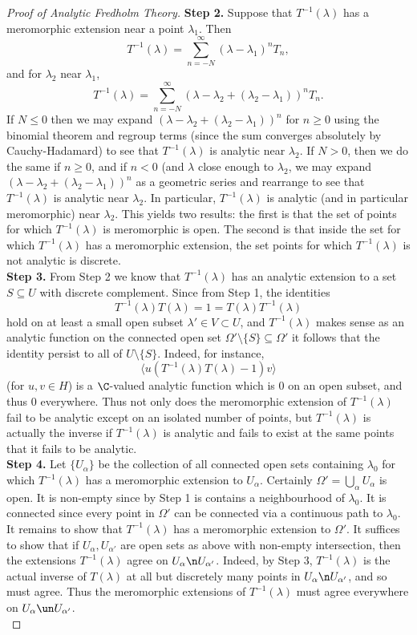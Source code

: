 \documentclass[12pt]{article}
\begin{document}
\begin{proof}[Proof of Analytic Fredholm Theory]
\textbf{Step 2. }Suppose that $T^{-1}(\lambda)$ has a meromorphic extension near a point $\lambda_1$. Then
 \[T^{-1}(\lambda) = \sum_{n=-N}^\infty (\lambda-\lambda_1)^nT_n,\]
 and for $\lambda_2$ near $\lambda_1$,
 \[T^{-1}(\lambda) = \sum_{n=-N}^\infty(\lambda-\lambda_2 + (\lambda_2-\lambda_1))^nT_n.\]
If $N \leq 0$ then we may expand  $(\lambda-\lambda_2 + (\lambda_2-\lambda_1))^n$ for $n \geq 0$ using the binomial theorem and regroup terms (since the sum converges absolutely by Cauchy-Hadamard) to see that $T^{-1}(\lambda)$ is analytic near $\lambda_2$. If $N > 0$, then we do the same if $n \geq 0$, and if $n < 0$ (and $\lambda$ close enough to $\lambda_2$, we may expand $(\lambda-\lambda_2 + (\lambda_2-\lambda_1))^n$ as a geometric series and rearrange to see that $T^{-1}(\lambda)$ is analytic near $\lambda_2$. In particular, $T^{-1}(\lambda)$ is analytic (and in particular meromorphic) near $\lambda_2$. This yields two results: the first is that the set of points for which $T^{-1}(\lambda)$ is meromorphic is open. The second is that inside the set for which $T^{-1}(\lambda)$ has a meromorphic extension, the set points for which $T^{-1}(\lambda)$ is not analytic is discrete. \\

\textbf{Step 3. }From Step 2 we know that $T^{-1}(\lambda)$ has an analytic extension to a set $S \subseteq U$ with discrete complement. Since from Step 1, the identities \[T^{-1}(\lambda)T(\lambda) = 1 = T(\lambda)T^{-1}(\lambda)\] hold on at least a small open subset $\lambda' \in V \subset U$, and $T^{-1}(\lambda)$ makes sense as an analytic function on the connected open set $\Omega'\setminus\{S\} \subseteq \Omega'$  it follows that the identity persist to all of $U\setminus\{S\}$. Indeed, for instance,
\[\langle u (T^{-1}(\lambda)T(\lambda)-1)v\rangle\] (for $u,v \in H$) is a $\C$-valued analytic function which is $0$ on an open subset, and thus $0$ everywhere. Thus not only does the meromorphic extension of $T^{-1}(\lambda)$ fail to be analytic except on an isolated number of points, but $T^{-1}(\lambda)$ is actually the inverse if $T^{-1}(\lambda)$ is analytic and fails to exist at the same points that it fails to be analytic.\\

\textbf{Step 4.} Let $\{U_{\alpha}\}$ be the collection of all connected open sets containing $\lambda_0$ for which $T^{-1}(\lambda)$ has a meromorphic extension to $U_\alpha$. Certainly $\Omega' = \bigcup_\alpha U_\alpha$ is open. It is non-empty since by Step 1 is contains a neighbourhood of $\lambda_0$. It is connected since every point in $\Omega'$ can be connected via a continuous path to $\lambda_0$. It remains to show that $T^{-1}(\lambda)$ has a meromorphic extension to $\Omega'$. It suffices to show that if $U_\alpha,U_{\alpha'}$ are open sets as above with non-empty intersection, then the extensions $T^{-1}(\lambda)$ agree on $U_\alpha \n U_{\alpha'}$. Indeed, by Step 3, $T^{-1}(\lambda)$ is the actual inverse of $T(\lambda)$ at all but discretely many points in $U_\alpha \n U_{\alpha'}$, and so must agree. Thus the meromorphic extensions of $T^{-1}(\lambda)$ must agree everywhere on $U_\alpha \un U_{\alpha'}$.\\


\end{proof}
\end{document}
